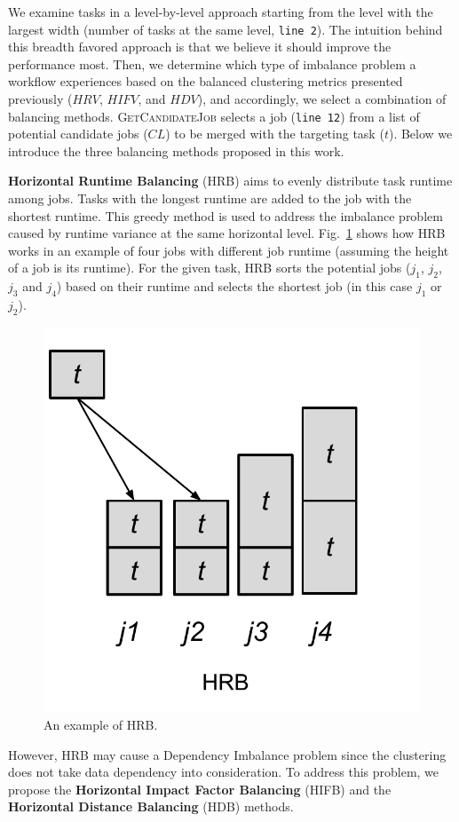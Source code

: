 \documentclass[final]{IEEEtran}
\begin{document}
We examine tasks in a level-by-level approach starting from the level with the largest width (number of tasks at the same level, \texttt{line 2}). The intuition behind this breadth favored approach is that we believe it should improve the performance most. Then, we determine which type of imbalance problem a workflow experiences based on the balanced clustering metrics presented previously ($HRV$, $HIFV$, and $HDV$), and accordingly, we select a combination of balancing methods. \textsc{GetCandidateJob} selects a job (\texttt{line 12}) from a list of potential candidate jobs ($CL$) to be merged with the targeting task ($t$). Below we introduce the three balancing methods proposed in this work.

\textbf{Horizontal Runtime Balancing} (HRB) aims to evenly distribute task runtime among jobs. Tasks with the longest runtime are added to the job with the shortest runtime. This greedy method is used to address the imbalance problem caused by runtime variance at the same horizontal level. Fig.~\ref{fig:algorithm_hrb} shows how HRB works in an example of four jobs with different job runtime (assuming the height of a job is its runtime). For the given task, HRB sorts the potential jobs ($j_1$, $j_2$, $j_3$ and $j_4$) based on their runtime and selects the shortest job (in this case $j_1$ or $j_2$). 

\begin{figure}[htb]
	\centering
	\includegraphics[width=0.5\linewidth]{figure/algorithm_hrb.pdf}
	\caption{An example of HRB.}
	\label{fig:algorithm_hrb}
	\vspace{-10pt}
\end{figure}

However, HRB may cause a Dependency Imbalance problem since the clustering does not take data dependency into consideration. To address this problem, we propose the \textbf{Horizontal Impact Factor Balancing} (HIFB) and the \textbf{Horizontal Distance Balancing} (HDB) methods. 
\end{document}
